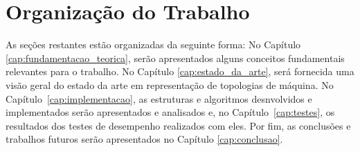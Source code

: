 \section{Organização do Trabalho}
\label{sec:organizacao_do_trabalho}

As seções restantes estão organizadas da seguinte forma:
No Capítulo \ref{cap:fundamentacao_teorica}, serão apresentados alguns conceitos fundamentais relevantes para o trabalho.
No Capítulo \ref{cap:estado_da_arte}, será fornecida uma visão geral do estado da arte em representação de topologias de máquina.
No Capítulo~\ref{cap:implementacao}, as estruturas e algoritmos desnvolvidos e implementados serão apresentados e analisados e, no Capítulo~\ref{cap:testes}, os resultados dos testes de desempenho realizados com eles.
Por fim, as conclusões e trabalhos futuros serão apresentados no Capítulo \ref{cap:conclusao}.
